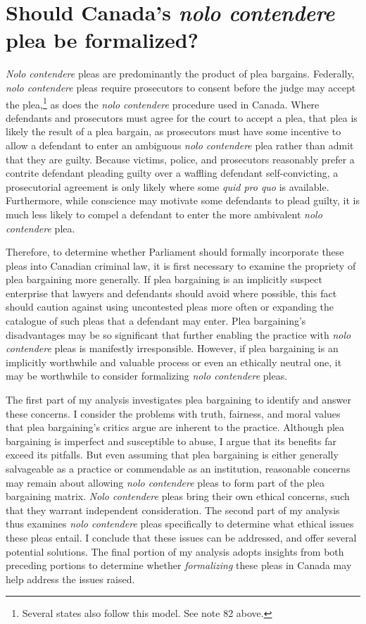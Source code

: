 \chapter{Should Canada's \textit{nolo contendere} plea be formalized?}

\setcounter{footnote}{149}

\textit{Nolo contendere} pleas are predominantly the product of plea bargains. Federally, \textit{nolo contendere} pleas require prosecutors to consent before the judge may accept the plea,\footnote{Several states also follow this model. See note 82 above.} as does the \textit{nolo contendere} procedure used in Canada. Where defendants and prosecutors must agree for the court to accept a plea, that plea is likely the result of a plea bargain, as prosecutors must have some incentive to allow a defendant to enter an ambiguous \textit{nolo contendere} plea rather than admit that they are guilty. Because victims, police, and prosecutors reasonably prefer a contrite defendant pleading guilty over a waffling defendant self-convicting, a prosecutorial agreement is only likely where some \textit{quid pro quo} is available. Furthermore, while conscience may motivate some defendants to plead guilty, it is much less likely to compel a defendant to enter the more ambivalent \textit{nolo contendere} plea.

Therefore, to determine whether Parliament should formally incorporate these pleas into Canadian criminal law, it is first necessary to examine the propriety of plea bargaining more generally. If plea bargaining is an implicitly suspect enterprise that lawyers and defendants should avoid where possible, this fact should caution against using uncontested pleas more often or expanding the catalogue of such pleas that a defendant may enter. Plea bargaining's disadvantages may be so significant that further enabling the practice with \textit{nolo contendere} pleas is manifestly irresponsible. However, if plea bargaining is an implicitly worthwhile and valuable process or even an ethically neutral one, it may be worthwhile to consider formalizing \textit{nolo contendere} pleas.

The first part of my analysis investigates plea bargaining to identify and answer these concerns. I consider the problems with truth, fairness, and moral values that plea bargaining's critics argue are inherent to the practice. Although plea bargaining is imperfect and susceptible to abuse, I argue that its benefits far exceed its pitfalls. But even assuming that plea bargaining is either generally salvageable as a practice or commendable as an institution, reasonable concerns may remain about allowing \textit{nolo contendere} pleas to form part of the plea bargaining matrix. \textit{Nolo contendere} pleas bring their own ethical concerns, such that they warrant independent consideration. The second part of my analysis thus examines \textit{nolo contendere} pleas specifically to determine what ethical issues these pleas entail. I conclude that these issues can be addressed, and offer several potential solutions. The final portion of my analysis adopts insights from both preceding portions to determine whether \textit{formalizing} these pleas in Canada may help address the issues raised.